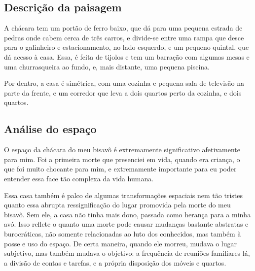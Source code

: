 \documentclass[12pt]{article}
\begin{document}
\subsection{Descrição da paisagem}
A chácara tem um portão de ferro baixo, que dá para uma pequena estrada de pedras onde cabem cerca de três carros, e divide-se entre uma rampa que desce para o galinheiro e estacionamento, no lado esquerdo, e um pequeno quintal, que dá acesso à casa. Essa, é feita de tijolos e tem um barração com algumas mesas e uma churrasqueira ao fundo, e, mais distante, uma pequena piscina. 

Por dentro, a casa é simétrica, com uma cozinha e pequena sala de televisão na parte da frente, e um corredor que leva a dois quartos perto da cozinha, e dois quartos.
\subsection{Análise do espaço}
O espaço da chácara do meu bisavô é extremamente significativo afetivamente para mim. Foi a primeira morte que presenciei em vida, quando era criança, o que foi muito chocante para mim, e extremamente importante para eu poder entender essa face tão complexa da vida humana.

Essa casa também é palco de algumas transformações espaciais nem tão tristes quanto essa abrupta ressignificação do lugar promovida pela morte do meu bisavô. Sem ele, a casa não tinha mais dono, passada como herança para a minha avó. Isso reflete o quanto uma morte pode causar mudanças bastante abstratas e burocráticas, não somente relacionadas ao luto dos conhecidos, mas também à posse e uso do espaço. De certa maneira, quando ele morreu, mudava o lugar subjetivo, mas também mudava o objetivo: a frequência de reuniões familiares lá, a divisão de contas e tarefas, e a própria disposição dos móveis e quartos.
\end{document}
